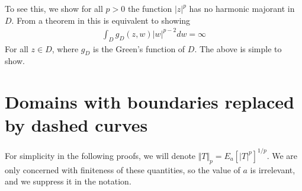\documentclass[a4paper, oneside, 12pt]{amsart}
\begin{document}
 To see this, we show for all $p>0$ the
function $|z|^p$ has no harmonic majorant in $D$. From a theorem in \cite{ransford} this is equivalent to showing
\begin{align*}
    \int_D g_D(z, w) |w|^{p-2} dw = \infty
\end{align*}
For all $z\in D$, where $g_D$ is the Green's function of $D$. The above is simple to show. \fi 

\section{Domains with boundaries replaced by dashed curves}

For simplicity in the following proofs, we will denote $\Vert T \Vert_p = E_a[|T|^p]^{1/p}$. We are only concerned with finiteness
of these quantities, so the value of $a$ is irrelevant, and we suppress it in the notation.
\end{document}
